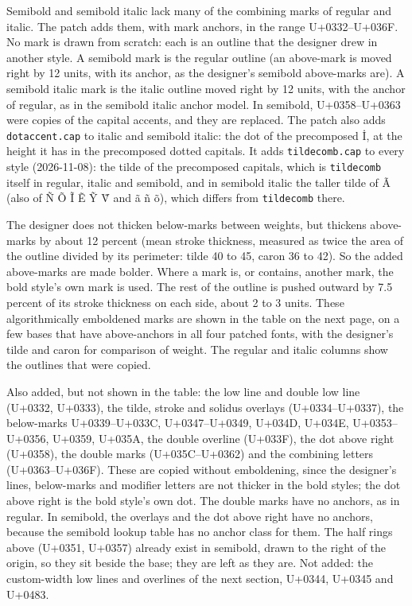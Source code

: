 \documentclass[landscape]{article}
\begin{document}
Semibold and semibold italic lack many of the combining marks of regular and italic.
The patch adds them, with mark anchors, in the range U+0332--U+036F.
No mark is drawn from scratch: each is an outline that the designer drew in another style.
A semibold mark is the regular outline (an above-mark is moved right by 12 units, with its anchor, as the designer's semibold above-marks are).
A semibold italic mark is the italic outline moved right by 12 units, with the anchor of regular, as in the semibold italic anchor model.
In semibold, U+0358--U+0363 were copies of the capital accents, and they are replaced.
The patch also adds \verb|dotaccent.cap| to italic and semibold italic: 
the dot of the precomposed İ, at the height it has in the precomposed dotted capitals.
It adds \verb|tildecomb.cap| to every style (2026-11-08): the tilde of the precomposed capitals,
which is \verb|tildecomb| itself in regular, italic and semibold, and in semibold italic the taller tilde of Ã (also of Ñ Õ Ĩ Ẽ Ỹ Ṽ and ã ñ õ), which differs from \verb|tildecomb| there.

The designer does not thicken below-marks between weights, but thickens above-marks by about 12 percent 
(mean stroke thickness, measured as twice the area of the outline divided by its perimeter: tilde 40 to 45, caron 36 to 42).
So the added above-marks are made bolder.
Where a mark is, or contains, another mark, the bold style's own mark is used.
The rest of the outline is pushed outward by 7.5 percent of its stroke thickness on each side, about 2 to 3 units.
These algorithmically emboldened marks are shown in the table on the next page, on a few bases that have above-anchors in all four patched fonts,
with the designer's tilde and caron for comparison of weight. 
The regular and italic columns show the outlines that were copied.

Also added, but not shown in the table: the low line and double low line (U+0332, U+0333), 
the tilde, stroke and solidus overlays (U+0334--U+0337), the below-marks U+0339--U+033C, U+0347--U+0349, U+034D, U+034E, U+0353--U+0356, U+0359, U+035A, 
the double overline (U+033F), the dot above right (U+0358), the double marks (U+035C--U+0362) and the combining letters (U+0363--U+036F).
These are copied without emboldening, since the designer's lines, below-marks and modifier letters are not thicker in the bold styles;
the dot above right is the bold style's own dot.
The double marks have no anchors, as in regular.
In semibold, the overlays and the dot above right have no anchors, because the semibold lookup table has no anchor class for them.
The half rings above (U+0351, U+0357) already exist in semibold, drawn to the right of the origin, so they sit beside the base; they are left as they are.
Not added: the custom-width low lines and overlines of the next section, U+0344, U+0345 and U+0483.
\end{document}
